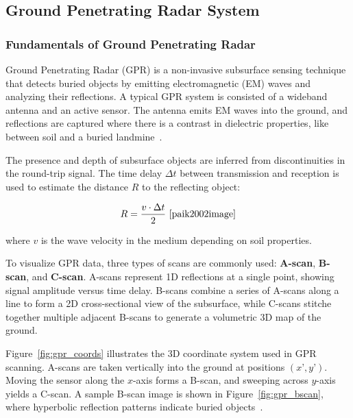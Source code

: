 \subsection{Ground Penetrating Radar System}

\subsubsection{Fundamentals of Ground Penetrating Radar}

Ground Penetrating Radar (GPR) is a non-invasive subsurface sensing technique that detects buried objects by emitting electromagnetic (EM) waves and analyzing their reflections. A typical GPR system is consisted of a wideband antenna and an active sensor. The antenna emits EM waves into the ground, and reflections are captured where there is a contrast in dielectric properties, like between soil and a buried landmine~\cite{paik2002image}.

The presence and depth of subsurface objects are inferred from discontinuities in the round-trip signal. The time delay $\Delta t$ between transmission and reception is used to estimate the distance $R$ to the reflecting object:

\[
R = \frac{v \cdot \Delta t}{2} ~\cite{paik2002image}
\]

where $v$ is the wave velocity in the medium depending on soil properties.

To visualize GPR data, three types of scans are commonly used: \textbf{A-scan}, \textbf{B-scan}, and \textbf{C-scan}. A-scans represent 1D reflections at a single point, showing signal amplitude versus time delay. B-scans combine a series of A-scans along a line to form a 2D cross-sectional view of the subsurface, while C-scans stitche together multiple adjacent B-scans to generate a volumetric 3D map of the ground. 

Figure~\ref{fig:gpr_coords} illustrates the 3D coordinate system used in GPR scanning. A-scans are taken vertically into the ground at positions $(x’, y’)$. Moving the sensor along the $x$-axis forms a B-scan, and sweeping across $y$-axis yields a C-scan. A sample B-scan image is shown in Figure~\ref{fig:gpr_bscan}, where hyperbolic reflection patterns indicate buried objects~\cite{paik2002image}.

